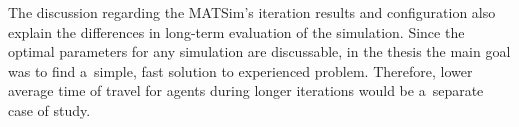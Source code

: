 \documentclass[twoside,12pt]{report}
\begin{document}
The discussion regarding the MATSim's iteration results and configuration also 
explain the differences in long-term evaluation of the simulation. Since the optimal parameters for any simulation are discussable, in the thesis the main goal was to find a~simple, fast solution to experienced problem. Therefore, lower average time of travel for agents during longer iterations would be a~separate case of study.

\clearpage
\thispagestyle{empty}
\mbox{}


\clearpage

\end{document}
